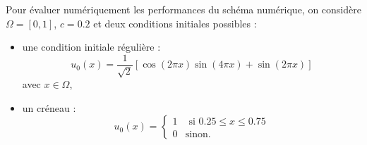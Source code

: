 Pour évaluer numériquement les performances du schéma numérique, on considère $\Omega=[0,1]$, $c=0.2$ et deux conditions initiales possibles :
\begin{itemize}
\item une condition initiale régulière :
\begin{equation}
u_0(x) = \dfrac{1}{\sqrt{2}} \left[ \cos (2 \pi x) \sin (4 \pi x) + \sin ( 2 \pi x ) \right]
\label{eq:transport1d_test_reg}
\end{equation}
avec $x \in \Omega$,
\item un créneau :
\begin{equation}
u_0(x) = \left\lbrace
\begin{array}{rl}
1 & \text{ si } 0.25 \leq x \leq 0.75 \\
0 & \text{sinon.}
\end{array}
\right.
\label{eq:transport1d_test_ireg}
\end{equation}
\end{itemize}


